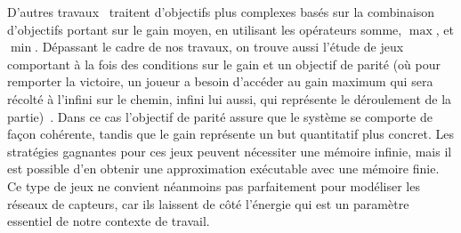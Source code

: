 D'autres travaux~\cite{velner12b} traitent d'objectifs plus complexes basés sur la combinaison d'objectifs portant sur le gain moyen, en utilisant les opérateurs somme, $\max$, et $\min$.
Dépassant le cadre de nos travaux, on trouve aussi l'étude de jeux comportant à la fois des conditions sur le gain et un objectif de parité (où pour remporter la victoire, un joueur a besoin d'accéder au gain maximum qui sera récolté à l'infini sur le chemin, infini lui aussi, qui représente le déroulement de la partie)~\cite{chatterjee05}.
Dans ce cas l'objectif de parité assure que le système se comporte de façon cohérente, tandis que le gain représente un but quantitatif plus concret.
Les stratégies gagnantes pour ces jeux peuvent nécessiter une mémoire infinie, mais il est possible d'en obtenir une approximation exécutable avec une mémoire finie.
Ce type de jeux ne convient néanmoins pas parfaitement pour modéliser les réseaux de capteurs, car ils laissent de côté l'énergie qui est un paramètre essentiel de notre contexte de travail.
